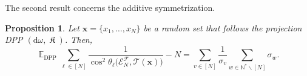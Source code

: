 \documentclass[twoside,11pt]{book}
\newtheorem{proposition}{Proposition}
\numberwithin{theorem}{chapter}
\numberwithin{definition}{chapter}
\numberwithin{proposition}{chapter}
\numberwithin{corollary}{chapter}
\numberwithin{example}{chapter}
\numberwithin{lemma}{chapter}
\numberwithin{assumption}{chapter}
\numberwithin{equation}{chapter}
\numberwithin{figure}{chapter}
\DeclareMathOperator{\DPP}{\mathrm{DPP}}
\DeclareMathOperator{\EX}{\mathbb{E}}
\DeclareMathOperator*{\KDPP}{\mathfrak{K}}
\begin{document}
The second result concerns the additive symmetrization.

\begin{proposition}\label{prop:ex_dpp_sum_inv_cos}
Let $\bm{x} = \{x_{1}, \dots , x_{N}\}$ be a random set that follows the projection DPP $(\mathrm{d}\omega, \KDPP )$. Then,
\begin{equation}
\EX_{\DPP}  \sum\limits_{\ell \in [N]} \frac{1}{\cos^{2} \theta_{\ell} \bigg(\mathcal{E}^{\mathcal{F}}_{N}, \mathcal{T}(\bm{x}) \bigg)} -N =  \sum\limits_{v \in [N]} \frac{1}{\sigma_{v}} \sum\limits_{w \in \mathbb{N}^{*}\smallsetminus [N]} \sigma_{w}.
\end{equation}
\end{proposition}



\end{document}

